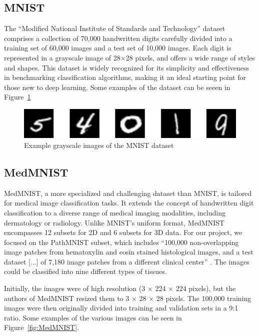 \subsection{MNIST}\label{mnist}
The ``Modified National Institute of Standards and Technology'' dataset \citep{mnist} comprises a collection of 70,000 handwritten digits carefully divided into a training set of 60,000 images and a test set of 10,000 images. Each digit is represented in a grayscale image of 28$\times$28 pixels, and offers a wide range of styles and shapes. This dataset is widely recognized for its simplicity and effectiveness in benchmarking classification algorithms, making it an ideal starting point for those new to deep learning. Some examples of the dataset can be seeen in Figure~\ref{fig:MNIST}

\begin{figure} [ht]
    \centering
    \includegraphics[width=.8\textwidth]{figures/MNIST.png}
    \caption{Example grayscale images of the MNIST dataset}\label{fig:MNIST}
\end{figure}

\subsection{MedMNIST}\label{medmnist}

MedMNIST, a more specialized and challenging dataset than MNIST, is tailored for medical image classification tasks. It extends the concept of handwritten digit classification to a diverse range of medical imaging modalities, including dermatology or radiology. Unlike MNIST's uniform format, MedMNIST encompasses 12 subsets for 2D and 6 subsets for 3D data. For our project, we focused on the PathMNIST \citep{kather2018, kather2019} subset, which includes ``100,000 non-overlapping image patches from hematoxylin and eosin stained histological images, and a test dataset [$\ldots$] of 7,180 image patches from a different clinical center'' \citep{medmnistv1}. The images could be classified into nine different types of tissues.

Initially, the images were of high resolution (3 $\times$ 224 $\times$ 224 pixels), but the authors of MedMNIST resized them to 3 $\times$ 28 $\times$ 28 pixels. The 100,000 training images were then originally divided into training and validation sets in a 9:1 ratio. Some examples of the various images can be seen in Figure~\ref{fig:MedMNIST}.

